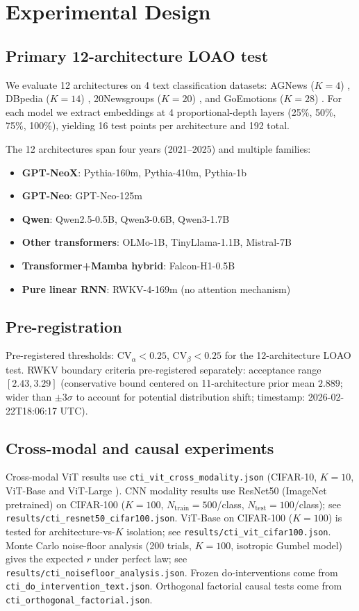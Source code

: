 \documentclass{article}
\begin{document}
\section{Experimental Design}
\subsection{Primary 12-architecture LOAO test}
We evaluate 12 architectures on 4 text classification datasets: AGNews ($K=4$) \citep{zhang2015}, DBpedia ($K=14$) \citep{lehmann2015}, 20Newsgroups ($K=20$) \citep{lang1995}, and GoEmotions ($K=28$) \citep{demszky2020}. For each model we extract embeddings at 4 proportional-depth layers (25\%, 50\%, 75\%, 100\%), yielding 16 test points per architecture and 192 total.

The 12 architectures span four years (2021--2025) and multiple families:
\begin{itemize}
\item \textbf{GPT-NeoX}: Pythia-160m, Pythia-410m, Pythia-1b \citep{biderman2023}
\item \textbf{GPT-Neo}: GPT-Neo-125m
\item \textbf{Qwen}: Qwen2.5-0.5B, Qwen3-0.6B, Qwen3-1.7B
\item \textbf{Other transformers}: OLMo-1B, TinyLlama-1.1B, Mistral-7B
\item \textbf{Transformer+Mamba hybrid}: Falcon-H1-0.5B
\item \textbf{Pure linear RNN}: RWKV-4-169m (no attention mechanism)
\end{itemize}

\subsection{Pre-registration}
Pre-registered thresholds: $\mathrm{CV}_\alpha<0.25$, $\mathrm{CV}_\beta<0.25$ for the 12-architecture LOAO test. RWKV boundary criteria pre-registered separately: acceptance range $[2.43, 3.29]$ (conservative bound centered on 11-architecture prior mean $2.889$; wider than $\pm3\sigma$ to account for potential distribution shift; timestamp: 2026-02-22T18:06:17 UTC).

\subsection{Cross-modal and causal experiments}
Cross-modal ViT results use \texttt{cti\_vit\_cross\_modality.json} (CIFAR-10, $K=10$, ViT-Base and ViT-Large \citep{dosovitskiy2021}).
CNN modality results use ResNet50 (ImageNet pretrained) on CIFAR-100 ($K=100$, $N_\mathrm{train}=500$/class, $N_\mathrm{test}=100$/class); see \texttt{results/cti\_resnet50\_cifar100.json}.
ViT-Base on CIFAR-100 ($K=100$) is tested for architecture-vs-$K$ isolation; see \texttt{results/cti\_vit\_cifar100.json}.
Monte Carlo noise-floor analysis (200 trials, $K=100$, isotropic Gumbel model) gives the expected $r$ under perfect law; see \texttt{results/cti\_noisefloor\_analysis.json}.
Frozen do-interventions come from \texttt{cti\_do\_intervention\_text.json}.
Orthogonal factorial causal tests come from \texttt{cti\_orthogonal\_factorial.json}.
\end{document}
